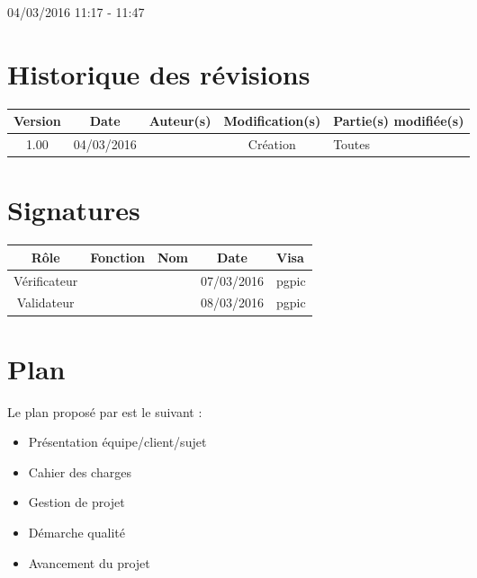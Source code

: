 \documentclass [a4paper] {article}
\begin{document}
04/03/2016			 				%
\hfill   
\hfill 	 11:17 - 11:47 				%



\section*{Historique des révisions}
\begin{center}
			\begin{tabular}{| c | c | c | c | p{4cm} |}
				\hline
				\rowcolor{Gray}
				Version & Date & Auteur(s) & Modification(s) & Partie(s) modifiée(s)		 \\
				\hline
				1.00 & 04/03/2016 & \Pierre & Création & Toutes \\
		\hline		
			\end{tabular}
		\end{center}

\section*{Signatures}

		\begin{center}
			\begin{tabular}{| c | c | c | c | p{4cm} |}
				\hline
				\rowcolor{Gray}
				Rôle & Fonction & Nom & Date & Visa		 \\
				\hline
				Vérificateur & \RQA & \Kafui & 07/03/2016 & pgpic \\[30pt]
				\hline
				Validateur & \CP & \Sergi & 08/03/2016 & pgpic \\[30pt]	
				\hline
			\end{tabular}
		\end{center}
		
\newpage		



\section{Plan}
Le plan proposé par \nomResponsablePPP{} est le suivant :
\begin{itemize}
\item Présentation équipe/client/sujet
\item Cahier des charges
\item Gestion de projet
\item Démarche qualité
\item Avancement du projet
\end{itemize}
\end{document}

